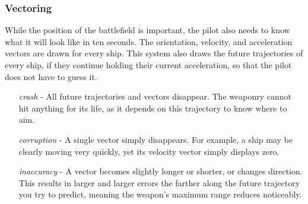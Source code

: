 \documentclass[a4paper]{article}
\begin{document}
\vspace{-0.5cm} \hspace{-18pt} \subsubsection{Vectoring} \label{fighter_vectoring} \vspace{-0.2cm}
While the position of the battlefield is important, the pilot also needs to know what it will look like in ten seconds. The orientation, velocity, and acceleration vectors are drawn for every ship. This system also draws the future trajectories of every ship, if they continue holding their current acceleration, so that the pilot does not have to guess it.
\begin{enumerate}[leftmargin=2cm]
\item [\textit{crash}] - All future trajectories and vectors disappear. The weaponry cannot hit anything for its life, as it depends on this trajectory to know where to aim.
\item [\textit{corruption}] - A single vector simply disappears. For example, a ship may be clearly moving very quickly, yet its velocity vector simply displays zero.
\item [\textit{inaccuracy}] - A vector becomes slightly longer or shorter, or changes direction. This results in larger and larger errors the farther along the future trajectory you try to predict, meaning the weapon's maximum range reduces noticeably.
\end{enumerate}
\end{document}
